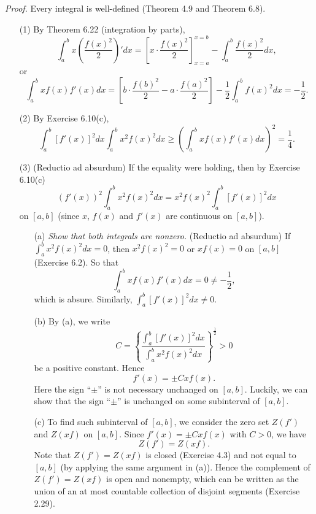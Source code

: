\documentclass{article}
\begin{document}
\emph{Proof.}
Every integral is well-defined (Theorem 4.9 and Theorem 6.8).
\begin{enumerate}
  \item[(1)]
  By Theorem 6.22 (integration by parts),
  \[
    \int_{a}^{b} x \left( \frac{f(x)^2}{2} \right)' dx
    =
    \left[ x \cdot \frac{f(x)^2}{2} \right]_{x=a}^{x=b}
      - \int_{a}^{b} \frac{f(x)^2}{2} dx,
  \]
  or
  \[
    \int_{a}^{b} xf(x)f'(x) dx
    =
      \left[b \cdot \frac{f(b)^2}{2} - a \cdot \frac{f(a)^2}{2} \right]
      - \frac{1}{2} \int_{a}^{b} f(x)^2 dx
    = - \frac{1}{2}.
  \]

  \item[(2)]
  By Exercise 6.10(c),
  \[
    \int_{a}^{b} [f'(x)]^2 dx \int_{a}^{b} x^2f(x)^2 dx
    \geq \left( \int_{a}^{b} xf(x)f'(x) dx \right)^2 = \frac{1}{4}.
  \]

  \item[(3)]
  (Reductio ad absurdum)
  If the equality were holding, then by Exercise 6.10(c)
  \[
    (f'(x))^2 \int_{a}^{b} x^2f(x)^2 dx
    = x^2f(x)^2 \int_{a}^{b} [f'(x)]^2 dx
  \]
  on $[a,b]$
  (since $x$, $f(x)$ and $f'(x)$ are continuous on $[a,b]$).

  \begin{enumerate}
  \item[(a)]
    \emph{Show that both integrals are nonzero.}
    (Reductio ad absurdum)
    If $\int_{a}^{b} x^2f(x)^2 dx = 0$,
    then $x^2f(x)^2 = 0$ or $xf(x) = 0$ on $[a,b]$ (Exercise 6.2).
    So that
    \[
      \int_{a}^{b} xf(x)f'(x) dx = 0 \neq -\frac{1}{2},
    \]
    which is absure.
    Similarly, $\int_{a}^{b} [f'(x)]^2 dx \neq 0$.

  \item[(b)]
    By (a), we write
    \[
      C
      =
      \left\{ \frac{\int_{a}^{b} [f'(x)]^2 dx}{\int_{a}^{b} x^2f(x)^2 dx} \right\}^{\frac{1}{2}}
      > 0
    \]
    be a positive constant.
    Hence
    \[
      f'(x) = \pm C x f(x).
    \]
    Here the sign ``$\pm$'' is not necessary unchanged on $[a,b]$.
    Luckily, we can show that the sign ``$\pm$'' is unchanged on some subinterval of $[a,b]$.

  \item[(c)]
    To find such subinterval of $[a,b]$,
    we consider the zero set $Z(f')$ and $Z(xf)$ on $[a,b]$.
    Since $f'(x) = \pm C x f(x)$ with $C > 0$, we have
    \[
      Z(f') = Z(xf).
    \]
    Note that $Z(f') = Z(xf)$ is closed (Exercise 4.3) and not equal to $[a,b]$
    (by applying the same argument in (a)).
    Hence the complement of $Z(f') = Z(xf)$ is open and nonempty,
    which can be written as the union of an at most countable collection
    of disjoint segments (Exercise 2.29).


\end{enumerate}
\end{enumerate}
\end{document}
